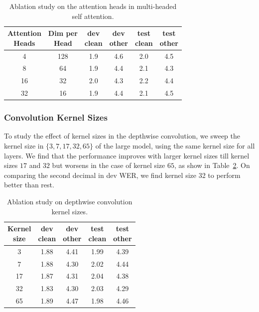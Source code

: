\begin{table}[h]
\begin{centering}
\caption{Ablation study on the attention heads in multi-headed self attention.}
\label{tab:atten_heads}
\vskip -0.1in
\begin{tabular}{@{}cc|cccc@{}}
\hline 
\makecell{Attention\\ Heads} & \makecell{Dim per\\ Head} & \makecell{dev\\ clean} & \makecell{dev\\ other} & \makecell{test\\ clean} & \makecell{test\\ other} \\
\hline 
\hline 
4 & 128 & 1.9 & 4.6 & 2.0 & 4.5 \tabularnewline
8 & 64 & 1.9 & 4.4 & 2.1 & 4.3 \tabularnewline
16 & 32 & 2.0 & 4.3 & 2.2 & 4.4 \tabularnewline
32 & 16 & 1.9 & 4.4 & 2.1 & 4.5 \tabularnewline
\hline
\end{tabular}
\par\end{centering}
\vskip -0.2in
\end{table}

\subsubsection{Convolution Kernel Sizes}
To study the effect of kernel sizes in the depthwise convolution, we sweep the kernel size in $\{3, 7, 17, 32, 65\}$ of the large model, using the same kernel size for all layers. We find that the performance improves with larger kernel sizes till kernel sizes $17$ and $32$ but worsens in the case of kernel size $65$, as show in Table~\ref{tab:kernel_sizes}. On comparing the second decimal in dev WER, we find kernel size 32 to perform better than rest. 

\begin{table}[h]
\begin{centering}
\caption{Ablation study on depthwise convolution kernel sizes.}
\label{tab:kernel_sizes}
\vskip -0.1in
\begin{tabular}{@{}c|cccc@{}}
\hline 
\makecell{Kernel\\ size}  & \makecell{dev\\ clean} & \makecell{dev\\ other} & \makecell{test\\ clean} & \makecell{test\\ other} \\
\hline 
\hline 
3 & 1.88 & 4.41 & 1.99 & 4.39 \tabularnewline
7 & 1.88 & 4.30 & 2.02 & 4.44 \tabularnewline
17 & 1.87 & 4.31 & 2.04 & 4.38 \tabularnewline
32 & 1.83 & 4.30 & 2.03 & 4.29 \tabularnewline
65 & 1.89 & 4.47 & 1.98 & 4.46 \tabularnewline
\hline
\end{tabular}
\par\end{centering}
\vskip -0.2in
\end{table}